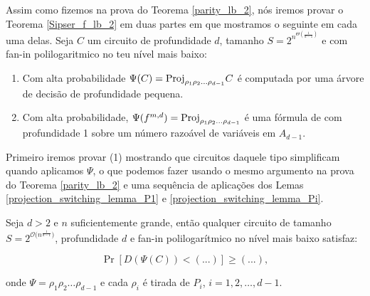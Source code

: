 Assim como fizemos na prova do Teorema \ref{parity_lb_2}, nós iremos provar o Teorema \ref{Sipser_f_lb_2} em duas partes em que mostramos o seguinte em cada uma delas. Seja $C$ um circuito de profundidade $d$, tamanho $S = 2^{n^{\Theta(\frac{1}{d - 1})}}$ e com fan-in polilogaritmico no teu nível mais baixo:

\begin{enumerate}

	\item Com alta probabilidade $\Psi(C) = \text{Proj}_{\rho_{1}\rho_{2}\dots\rho_{d - 1}}C$ é  computada por uma árvore de decisão de profundidade pequena.
	
	\item Com alta probabilidade, $\Psi(f^{m, d}) = \text{Proj}_{\rho_{1}\rho_{2}\dots\rho_{d - 1}}$ é uma fórmula de com profundidade 1 sobre um número razoável de variáveis em $A_{d - 1}$.

\end{enumerate}

Primeiro iremos provar (1) mostrando que circuitos daquele tipo simplificam quando aplicamos $\Psi$, o que podemos fazer usando o mesmo argumento na prova do Teorema \ref{parity_lb_2} e uma sequência de aplicações dos Lemas \ref{projection_switching_lemma_P1} e \ref{projection_switching_lemma_Pi}.

\begin{prop}

Seja $d > 2$ e $n$ suficientemente grande, então qualquer circuito de tamanho $S = 2^{\mathcal{O} \big(n^{\frac{1}{d - 1}} \big)}$, profundidade $d$ e fan-in polilogarítmico no nível mais baixo satisfaz:

\begin{equation*}
	\Pr[D(\Psi(C)) < (...)] \geq (...),
\end{equation*}

onde $\Psi = \rho_{1}\rho_{2}\dots\rho_{d - 1}$ e cada $\rho_{i}$ é tirada de $P_{i}$, $i = 1, 2, \dots, d - 1$.

\end{prop}

